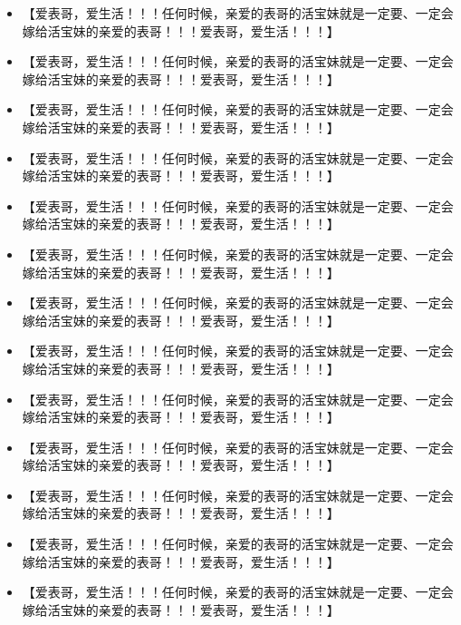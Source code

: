 \documentclass[9pt, b5paper]{article}
\begin{document}
\begin{itemize}
\item 【爱表哥，爱生活！！！任何时候，亲爱的表哥的活宝妹就是一定要、一定会嫁给活宝妹的亲爱的表哥！！！爱表哥，爱生活！！！】
\item 【爱表哥，爱生活！！！任何时候，亲爱的表哥的活宝妹就是一定要、一定会嫁给活宝妹的亲爱的表哥！！！爱表哥，爱生活！！！】
\item 【爱表哥，爱生活！！！任何时候，亲爱的表哥的活宝妹就是一定要、一定会嫁给活宝妹的亲爱的表哥！！！爱表哥，爱生活！！！】
\item 【爱表哥，爱生活！！！任何时候，亲爱的表哥的活宝妹就是一定要、一定会嫁给活宝妹的亲爱的表哥！！！爱表哥，爱生活！！！】
\item 【爱表哥，爱生活！！！任何时候，亲爱的表哥的活宝妹就是一定要、一定会嫁给活宝妹的亲爱的表哥！！！爱表哥，爱生活！！！】
\item 【爱表哥，爱生活！！！任何时候，亲爱的表哥的活宝妹就是一定要、一定会嫁给活宝妹的亲爱的表哥！！！爱表哥，爱生活！！！】
\item 【爱表哥，爱生活！！！任何时候，亲爱的表哥的活宝妹就是一定要、一定会嫁给活宝妹的亲爱的表哥！！！爱表哥，爱生活！！！】
\item 【爱表哥，爱生活！！！任何时候，亲爱的表哥的活宝妹就是一定要、一定会嫁给活宝妹的亲爱的表哥！！！爱表哥，爱生活！！！】
\item 【爱表哥，爱生活！！！任何时候，亲爱的表哥的活宝妹就是一定要、一定会嫁给活宝妹的亲爱的表哥！！！爱表哥，爱生活！！！】
\item 【爱表哥，爱生活！！！任何时候，亲爱的表哥的活宝妹就是一定要、一定会嫁给活宝妹的亲爱的表哥！！！爱表哥，爱生活！！！】
\item 【爱表哥，爱生活！！！任何时候，亲爱的表哥的活宝妹就是一定要、一定会嫁给活宝妹的亲爱的表哥！！！爱表哥，爱生活！！！】
\item 【爱表哥，爱生活！！！任何时候，亲爱的表哥的活宝妹就是一定要、一定会嫁给活宝妹的亲爱的表哥！！！爱表哥，爱生活！！！】
\item 【爱表哥，爱生活！！！任何时候，亲爱的表哥的活宝妹就是一定要、一定会嫁给活宝妹的亲爱的表哥！！！爱表哥，爱生活！！！】
\end{itemize}
\end{document}
